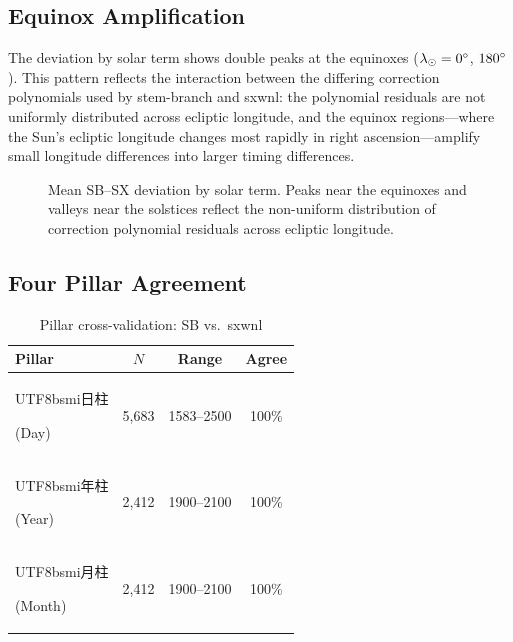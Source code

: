 \documentclass[10pt,a4paper]{article}
\newcommand{\zh}[1]{\begin{CJK}{UTF8}{bsmi}#1\end{CJK}}
\begin{document}
\subsection{Equinox Amplification}

The deviation by solar term shows double peaks at the equinoxes
($\lambda_\odot = 0\degree$, $180\degree$). This pattern reflects the
interaction between the differing correction polynomials used by
stem-branch and sxwnl: the polynomial residuals are not uniformly
distributed across ecliptic longitude, and the equinox regions---where
the Sun's ecliptic longitude changes most rapidly in right
ascension---amplify small longitude differences into larger timing
differences.

\begin{figure}[t]
\centering
{}
\caption{Mean SB--SX deviation by solar term. Peaks near the equinoxes
and valleys near the solstices reflect the non-uniform distribution of
correction polynomial residuals across ecliptic longitude.}
\label{fig:byterm}
\end{figure}

\subsection{Four Pillar Agreement}

\begin{table}[H]
\centering
\caption{Pillar cross-validation: SB vs.\ sxwnl}
\label{tab:pillars}
\footnotesize
\begin{tabular}{lccc}
\toprule
\textbf{Pillar} & \textbf{$N$} & \textbf{Range} & \textbf{Agree} \\
\midrule
\zh{日柱} (Day) & 5,683 & 1583--2500 & 100\% \\
\zh{年柱} (Year) & 2,412 & 1900--2100 & 100\% \\
\zh{月柱} (Month) & 2,412 & 1900--2100 & 100\% \\
\bottomrule
\end{tabular}
\end{table}
\end{document}
